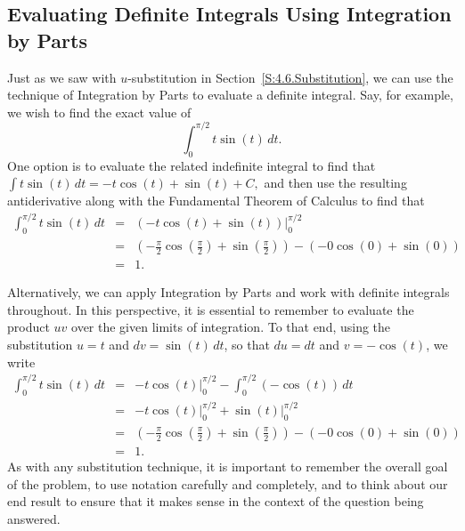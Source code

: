 \subsection*{Evaluating Definite Integrals Using Integration by Parts} 

Just as we saw with $u$-substitution in Section~\ref{S:4.6.Substitution}, we can use the technique of Integration by Parts to evaluate a definite integral.  Say, for example, we wish to find the exact value of 
$$\int_0^{\pi/2} t\sin(t) \, dt.$$
One option is to evaluate the related indefinite integral to find that $\int t\sin(t) \, dt = -t \cos(t) + \sin(t) + C,$ and then use the resulting antiderivative along with the Fundamental Theorem of Calculus to find that \small
\begin{eqnarray*}
  \int_0^{\pi/2} t\sin(t) \, dt & = & \left( -t \cos(t) + \sin(t) \right) \bigg\vert_0^{\pi/2} \\
  					& = & \left( -\frac{\pi}{2} \cos\left(\frac{\pi}{2}\right) + \sin\left(\frac{\pi}{2}\right) \right) - \left( -0 \cos(0) + \sin(0) \right) \\
					& = & 1.
\end{eqnarray*} \normalsize

Alternatively, we can apply Integration by Parts and work with definite integrals throughout.  In this perspective, it is essential to remember to evaluate the product $uv$ over the given limits of integration.  To that end, using the substitution $u = t$ and $dv = \sin(t) \, dt$, so that $du = dt$ and $v = -\cos(t)$, we write \small
\begin{eqnarray*}
  \int_0^{\pi/2} t\sin(t) \, dt & = &  -t \cos(t) \bigg\vert_0^{\pi/2} - \int_0^{\pi/2} (-\cos(t)) \, dt \\
  					& = &  -t \cos(t) \bigg\vert_0^{\pi/2}  +  \sin(t) \bigg\vert_0^{\pi/2}  \\
					& = & \left( -\frac{\pi}{2} \cos\left(\frac{\pi}{2}\right) + \sin\left(\frac{\pi}{2}\right) \right) - \left( -0 \cos(0) + \sin(0) \right) \\
					& = & 1.					
\end{eqnarray*} \normalsize
As with any substitution technique, it is important to remember the overall goal of the problem, to use notation carefully and completely, and to think about our end result to ensure that it makes sense in the context of the question being answered.



